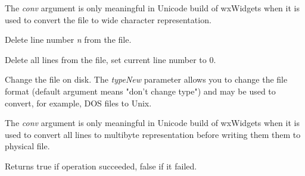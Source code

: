 The {\it conv} argument is only meaningful in Unicode build of wxWidgets when
it is used to convert the file to wide character representation.

\label{wxtextfileremoveline}


Delete line number {\it n} from the file.

\label{wxtextfileclear}


Delete all lines from the file, set current line number to 0.

\label{wxtextfilewrite}


Change the file on disk. The {\it typeNew} parameter allows you to change the
file format (default argument means "don't change type") and may be used to
convert, for example, DOS files to Unix.

The {\it conv} argument is only meaningful in Unicode build of wxWidgets when
it is used to convert all lines to multibyte representation before writing them
them to physical file.

Returns true if operation succeeded, false if it failed.

